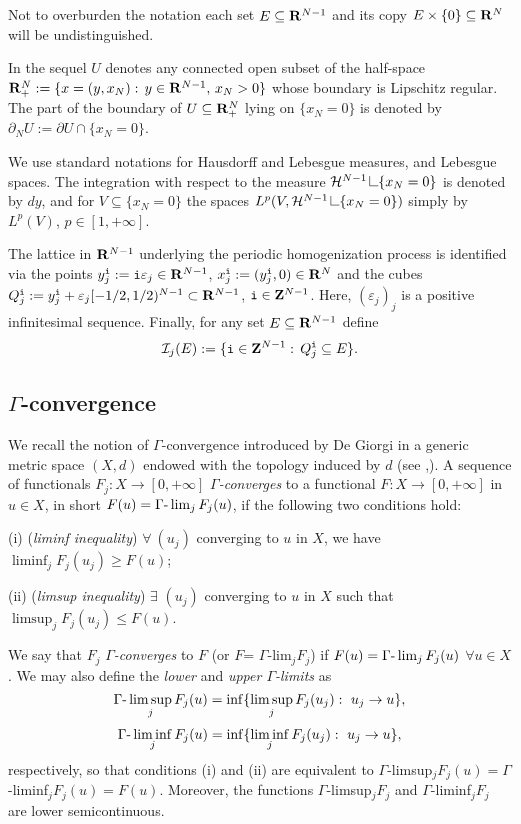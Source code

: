 \documentclass[10pt,reqno]{amsart}
\numberwithin{equation}{section}
\def\H{{\mathcal H}}
\def\R{{\bf R}}
\def\Z{{\bf Z}}
\def\eps{{\varepsilon}_j}
\def\ii{{\tt i}}
\def\Qijo{Q_j^\ii}
\def\res{\mathop{\hbox{\vrule height 7pt width .4pt depth 0pt
\vrule height .4pt width 6pt depth 0pt}}\nolimits}
\def\Ieps{{\mathcal I}_j}
\def\IIeps{{\mathscr I}_j}
\def\xijo{y_j^{\ii}}
\def\xije{x_{j}^\ii}
\def\xn{x_N}
\def\xnc{y}%
\def\UU{\partial_NU}
\def\res{\mathop{\hbox{\vrule height 7pt width .4pt depth 0pt
\vrule height .4pt width 6pt depth 0pt}}\nolimits}
\begin{document}
Not to overburden the notation each set $E\subseteq \R^{N-1}$ and
its copy $E\times\{0\}\subseteq\R^N$ will be undistinguished.

In the sequel $U$ denotes any connected open subset of the half-space
$\R^N_+:=\{x=(\xnc,\xn):\,\xnc\in\R^{N-1},\, \xn>0\}$ whose boundary is
Lipschitz regular. The part of the boundary of $U\subseteq\R^N_+$
lying on $\{\xn=0\}$ is denoted by $\UU:=\partial U\cap\{\xn=0\}$.

We use standard notations for Hausdorff and Lebesgue measures,
and Lebesgue spaces.
The integration with respect to the measure $\H^{N-1}\res\{\xn=0\}$ is
denoted by $d\xnc$, and for $V\subseteq\{\xn=0\}$
the spaces $L^p(V,\H^{N-1}\res\{\xn=0\})$
simply by $L^p(V)$, $p\in[1,+\infty]$.

The lattice in $\R^{N-1}$ underlying the periodic homogenization
process is identified via the points $\xijo:=\ii\eps\in\R^{N-1}$, 
$\xije:=(\xijo,0)\in\R^N$ and the cubes
$\Qijo:=\xijo+\eps[-1/2,1/2)^{N-1}\subset\R^{N-1}$, $\ii\in\Z^{N-1}$.
Here, $(\eps)_j$ is a positive infinitesimal sequence.
Finally, for any set $E\subseteq \R^{N-1}$ define
$$
\Ieps(E):=\{\ii\in\Z^{N-1}:\,\Qijo\subseteq E\}. %
$$

\subsection{$\Gamma$-convergence}%
We recall the notion of $\Gamma$-convergence introduced by De Giorgi
in a generic metric space $(X,d)$ endowed with the topology induced
by $d$ (see \cite{DM},\cite{B3}).
A sequence of functionals $F_j:X\to [0,+\infty]$
{\it $\Gamma$-converges} to a functional $F:X\to [0,+\infty]$ in $u\in X$,
in short $F(u)=\Gamma\hbox{-}\lim_{j}F_j(u)$,
if %
the following two conditions hold:

{(i)} ({\it liminf inequality}) $\forall\  (u_j)$
converging to $u$ in $X$,
we have $\liminf_jF_{j}(u_j)\ge F(u)$;

{(ii)} ({\it limsup inequality}) $\exists$ $(u_j)$ converging to $u$ in $X$
such that $\limsup_jF_{j}(u_j)\le F(u)$.

\noindent We say that $F_j$ \emph{$\Gamma$-converges} to $F$
(or $F$= $\Gamma$-lim$_{j}F_j$) if
$F(u)=\Gamma\hbox{-}\lim_{j}F_j(u)$ $\forall u\in X$.
We may also define the \emph{lower} and \emph{upper $\Gamma$-limits} as
$$
\Gamma\hbox{-}\limsup_{j}F_j(u)=\inf\{\limsup_{j}
F_j(u_j):\  u_j\to u\},
$$
$$
\Gamma\hbox{-}\liminf_{j}F_j(u)=\inf\{\liminf_{j}
F_j(u_j):\  u_j\to u\},
$$
respectively, so that conditions (i) and (ii) are equivalent to
$\Gamma$-limsup$_j F_j(u)=\Gamma$-liminf$_j F_j(u)=F(u)$.
Moreover, the functions $\Gamma$-limsup$_j F_j$ and
$\Gamma$-liminf$_j F_j$ are lower semicontinuous.
\end{document}
